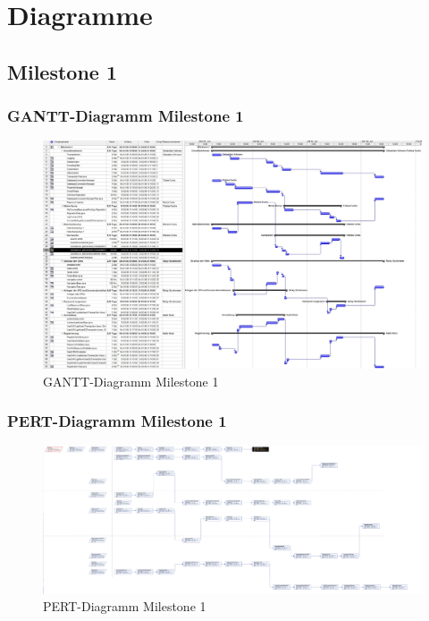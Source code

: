 \chapter{Diagramme}

\section{Milestone 1}
\subsection{GANTT-Diagramm Milestone 1}
 \begin{figure}[h]
 		\centering
 		\includegraphics[width=1.4\linewidth, angle=90]{Grafiken/Milestone1Gantt}
 		\caption{GANTT-Diagramm Milestone 1}
 		\label{fig:GANTT-Diagramm Milestone 1}
 \end{figure}



\subsection{PERT-Diagramm Milestone 1}
\begin{figure}[h]
	\centering
	\includegraphics[width=1.4\linewidth, angle=90]{Grafiken/Milestone1Pert}
	\caption{PERT-Diagramm Milestone 1}
	\label{fig:PERT-Diagramm Milestone 1}
\end{figure}

